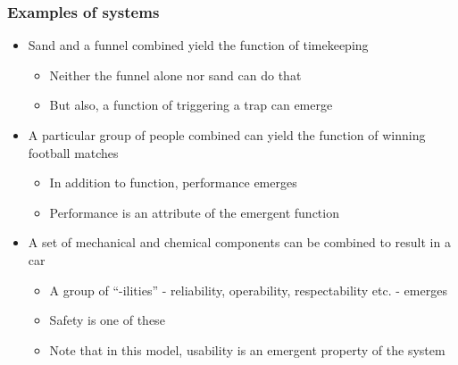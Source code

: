 \documentclass[10pt, compress]{beamer}
\begin{document}
\begin{frame}[fragile]
  \frametitle{Examples of systems}
  	\begin{itemize}
  		\item Sand and a funnel combined yield the function of timekeeping
		\begin{itemize}
			\item Neither the funnel alone nor sand can do that
			\item But also, a function of triggering a trap can emerge
		\end{itemize}
		\item A particular group of people combined can yield the function of winning football matches
		\begin{itemize}
			\item In addition to function, performance emerges
			\item Performance is an attribute of the emergent function
		\end{itemize}		
		\item A set of mechanical and chemical components can be combined to result in a car
		\begin{itemize}
			\item A group of \enquote{-ilities} - reliability, operability, respectability etc. - emerges
			\item Safety is one of these
			\item Note that in this model, usability is an emergent property of the system 
		\end{itemize}		
		
	\end{itemize}
\end{frame}
\end{document}
